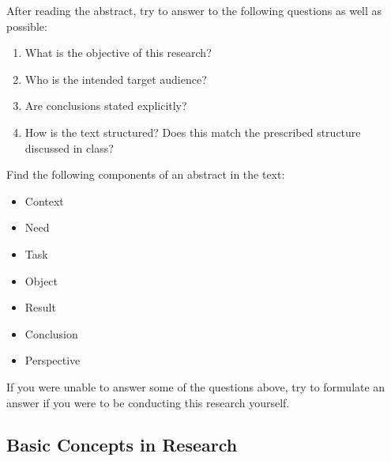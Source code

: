 \begin{exercise}
  After reading the abstract, try to answer to the following questions as well as possible:
  
  \begin{enumerate}
    \item What is the objective of this research?
    \item Who is the intended target audience?
    \item Are conclusions stated explicitly? 
    \item How is the text structured? Does this match the prescribed structure discussed in class?
  \end{enumerate}
\end{exercise}

\begin{exercise}
  Find the following components of an abstract in the text:
  
  \begin{itemize}
    \item Context
    \item Need
    \item Task
    \item Object
    \item Result
    \item Conclusion
    \item Perspective
  \end{itemize}

  If you were unable to answer some of the questions above, try to formulate an answer if you were to be conducting this research yourself.
\end{exercise}

\subsection{Basic Concepts in Research}


